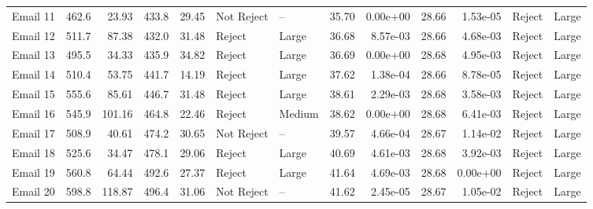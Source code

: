 \begin{tabular}{lrrrrllrrrrll}
 Email 11 &              462.6 &   23.93 &               433.8 &  29.45 &  Not Reject &          -- &                    35.70 &  0.00e+00 &                     28.66 &  1.53e-05 &  Reject &       Large \\
 Email 12 &              511.7 &   87.38 &               432.0 &  31.48 &      Reject &       Large &                    36.68 &  8.57e-03 &                     28.66 &  4.68e-03 &  Reject &       Large \\
 Email 13 &              495.5 &   34.33 &               435.9 &  34.82 &      Reject &       Large &                    36.69 &  0.00e+00 &                     28.68 &  4.95e-03 &  Reject &       Large \\
 Email 14 &              510.4 &   53.75 &               441.7 &  14.19 &      Reject &       Large &                    37.62 &  1.38e-04 &                     28.66 &  8.78e-05 &  Reject &       Large \\
 Email 15 &              555.6 &   85.61 &               446.7 &  31.48 &      Reject &       Large &                    38.61 &  2.29e-03 &                     28.68 &  3.58e-03 &  Reject &       Large \\
 Email 16 &              545.9 &  101.16 &               464.8 &  22.46 &      Reject &      Medium &                    38.62 &  0.00e+00 &                     28.68 &  6.41e-03 &  Reject &       Large \\
 Email 17 &              508.9 &   40.61 &               474.2 &  30.65 &  Not Reject &          -- &                    39.57 &  4.66e-04 &                     28.67 &  1.14e-02 &  Reject &       Large \\
 Email 18 &              525.6 &   34.47 &               478.1 &  29.06 &      Reject &       Large &                    40.69 &  4.61e-03 &                     28.68 &  3.92e-03 &  Reject &       Large \\
 Email 19 &              560.8 &   64.44 &               492.6 &  27.37 &      Reject &       Large &                    41.64 &  4.69e-03 &                     28.68 &  0.00e+00 &  Reject &       Large \\
 Email 20 &              598.8 &  118.87 &               496.4 &  31.06 &  Not Reject &          -- &                    41.62 &  2.45e-05 &                     28.67 &  1.05e-02 &  Reject &       Large \\
\bottomrule
\end{tabular}
